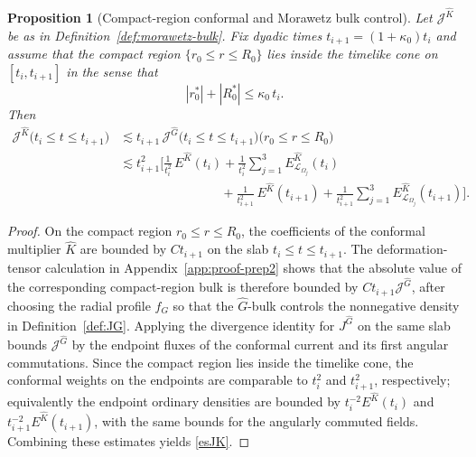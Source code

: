 \documentclass[11pt]{article}
\numberwithin{equation}{section}
\theoremstyle{plain}
\newtheorem{proposition}[theorem]{Proposition}
\theoremstyle{definition}
\theoremstyle{remark}
\begin{document}
\begin{proposition}[Compact-region conformal and Morawetz bulk control]\label{prep2}
	Let $\mathcal{J}^{\hat K}$ be as in Definition~\ref{def:morawetz-bulk}. Fix dyadic times $t_{i+1}=(1+\kappa_0)t_{i}$ and assume that the compact region $\{r_0\le r\le R_0\}$ lies inside the timelike cone on $[t_i,t_{i+1}]$ in the sense that
	\begin{equation}
	|r_0^{\ast}|+|R_0^{\ast}|\le \kappa_0\,t_i.
	\end{equation}
	Then
\begin{eqnarray}\label{esJK}
\mathcal{J}^{\hat K}\bigl(t_i\le t\le t_{i+1}\bigr)
&\lesssim
t_{i+1}\,\mathcal{J}^{\hat G}\bigl(t_i\le t\le t_{i+1}\bigr)\bigl(r_0\le r\le R_0\bigr)
\nonumber\\
&\lesssim
t_{i+1}^{2}\Biggl[
\frac{1}{t_i^{2}}\,E^{\hat K}(t_i)
+
\frac{1}{t_i^{2}}\sum_{j=1}^{3}E_{\mathcal{L}_{\Omega_j}}^{\hat K}(t_i)
\nonumber\\
&\qquad\qquad\qquad\qquad
+
\frac{1}{t_{i+1}^{2}}\,E^{\hat K}(t_{i+1})
+
\frac{1}{t_{i+1}^{2}}\sum_{j=1}^{3}E_{\mathcal{L}_{\Omega_j}}^{\hat K}(t_{i+1})
\Biggr].
\end{eqnarray}
\end{proposition}
\begin{proof}
On the compact region $r_0\le r\le R_0$, the coefficients of the conformal multiplier $\hat K$ are bounded by $Ct_{i+1}$ on the slab $t_i\le t\le t_{i+1}$.  The deformation-tensor calculation in Appendix~\ref{app:proof-prep2} shows that the absolute value of the corresponding compact-region bulk is therefore bounded by $Ct_{i+1}\mathcal J^{\hat G}$, after choosing the radial profile $f_G$ so that the $\hat G$-bulk controls the nonnegative density in Definition~\ref{def:JG}.  Applying the divergence identity for $J^{\hat G}$ on the same slab bounds $\mathcal J^{\hat G}$ by the endpoint fluxes of the conformal current and its first angular commutations.  Since the compact region lies inside the timelike cone, the conformal weights on the endpoints are comparable to $t_i^2$ and $t_{i+1}^2$, respectively; equivalently the endpoint ordinary densities are bounded by $t_i^{-2}E^{\hat K}(t_i)$ and $t_{i+1}^{-2}E^{\hat K}(t_{i+1})$, with the same bounds for the angularly commuted fields.  Combining these estimates yields \eqref{esJK}.
\end{proof}
\end{document}
